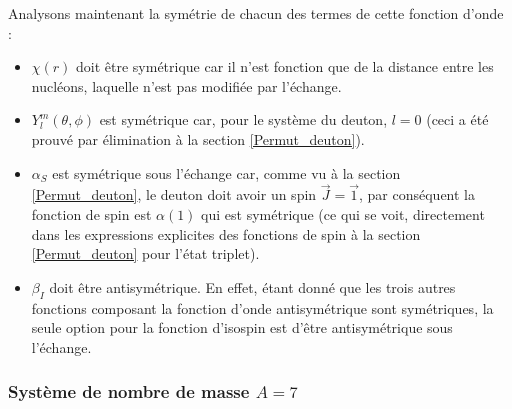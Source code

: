 Analysons maintenant la symétrie de chacun des termes de cette fonction d'onde :
\begin{itemize}[label=$\bullet$]
    \item $\chi(r)$ doit être symétrique car il n'est fonction que de la distance entre les nucléons, laquelle n'est pas modifiée par l'échange.
    \item $Y_l^m(\theta,\phi)$ est symétrique car, pour le système du deuton, $l=0$ (ceci a été prouvé par élimination à la section \ref{Permut_deuton}).
    \item $\alpha_S$ est symétrique sous l'échange car, comme vu à la section \ref{Permut_deuton}, le deuton doit avoir un spin $\vec{J}=\vec{1}$, par conséquent la fonction de spin est $\alpha(1)$ qui est symétrique (ce qui se voit, directement dans les expressions explicites des fonctions de spin à la section \ref{Permut_deuton} pour l'état triplet).
    \item $\beta_I$ doit être antisymétrique. En effet, étant donné que les trois autres fonctions composant la fonction d'onde antisymétrique sont symétriques, la seule option pour la fonction d'isospin est d'être antisymétrique sous l'échange.
\end{itemize}



\subsubsection{Système de nombre de masse $A=7$}


